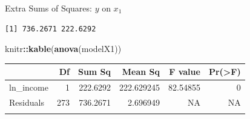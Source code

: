 \documentclass[
  ignorenonframetext,
]{beamer}
\newenvironment{Shaded}{\begin{snugshade}}{\end{snugshade}}
\newcommand{\DecValTok}[1]{\textcolor[rgb]{0.00,0.00,0.81}{#1}}
\newcommand{\FunctionTok}[1]{\textcolor[rgb]{0.13,0.29,0.53}{\textbf{#1}}}
\newcommand{\NormalTok}[1]{#1}
\newcommand{\OtherTok}[1]{\textcolor[rgb]{0.56,0.35,0.01}{#1}}
\newcommand{\SpecialCharTok}[1]{\textcolor[rgb]{0.81,0.36,0.00}{\textbf{#1}}}
\begin{document}
\begin{frame}[fragile]{Extra Sums of Squares: \(y\) on \(x_1\)}
\label{extra-sums-of-squares-y-on-x_1-1}
\normalsize

\begin{Shaded}
\end{Shaded}

\begin{verbatim}
[1] 736.2671 222.6292
\end{verbatim}

\begin{Shaded}
\begin{Highlighting}[]
\NormalTok{knitr}\SpecialCharTok{::}\FunctionTok{kable}\NormalTok{(}\FunctionTok{anova}\NormalTok{(modelX1))}
\end{Highlighting}
\end{Shaded}

\begin{longtable}[]{@{}lrrrrr@{}}
\toprule\noalign{}
& Df & Sum Sq & Mean Sq & F value & Pr(\textgreater F) \\
\midrule\noalign{}
\endhead
ln\_income & 1 & 222.6292 & 222.629245 & 82.54855 & 0 \\
Residuals & 273 & 736.2671 & 2.696949 & NA & NA \\
\bottomrule\noalign{}
\end{longtable}

\normalsize
\end{frame}
\end{document}
